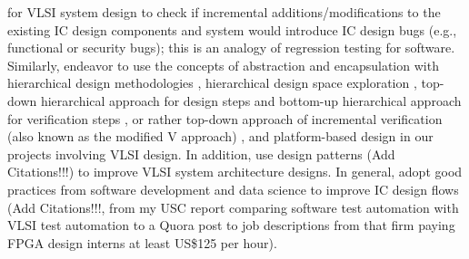 \documentclass[letter,12pt]{article}
\begin{document}
\cite{Poulos2018,Poulos2018a,Adler2017,Adler2017a,Poulos2014,Poulos2014a,Poulos2013,Bombieri2012,Bailey2010a,Li2008a,Agans2006,Thoziyoor2005,Burgess2004,Singh2004,Glusman2003} for VLSI system design to check if incremental additions/modifications to the existing IC design components and system would introduce IC design bugs (e.g., functional or security bugs); this is an analogy of regression testing for software. Similarly, endeavor to use the concepts of abstraction \cite{Lee2017a,Kropf1999,Hussein2008,Haynal2008a,Chauhan2007,Harris2007,Wang2006,Wang2004,Cong2003a,McIver2003,Stan2003,Furber2000,Kropf1999,Gil1998} and encapsulation \cite{Reddy2011,Marrer2009,Scott2009,Haynal2008a,Krogh2008a,Lee2008c,McIver2005,Baldwin2004,Raymond2004,Spolsky2004,Conway2003,Felleisen2001,Pratt2001,BrooksJr1995} with hierarchical design methodologies \cite{Buttazzo2011,Nuzzo2011,Fingeroff2010,Safarpour2009,Vaishnavi2008,Adya2004,Gupta2004,Krishnamachari1997,Krishnamachari1995}, hierarchical design space exploration \cite{Sun2011}, top-down hierarchical approach for design steps \cite{Kaeslin2015,Chen2012,Doboli2011,Gajski2009,Wieferink2008,Ho2007,Lu2007,SangiovanniVincentelli2007,Frevert2005} and bottom-up hierarchical approach for verification steps \cite{Chauhan2007,Wang2006,Frevert2005,McIver2003,Rashinkar2002}, or rather top-down approach of incremental verification (also known as the modified V approach) \cite{Bailey2010a}, and platform-based design \cite{Bailey2010a,Saponara2010,Gajski2009,Densmore2008,SangiovanniVincentelli2008,SangiovanniVincentelli2007,Burton2006,Saleh2006,Bailey2005,Madisetti2005,Martin2003,Chang2002,SangiovanniVincentelli2001,Keutzer2000} in our projects involving VLSI design. In addition, use design patterns ({\Huge Add Citations!!!}) to improve VLSI system architecture designs. In general, adopt good practices from software development and data science to improve IC design flows ({\Huge Add Citations!!!}, from my USC report comparing software test automation with VLSI test automation to a Quora post to job descriptions from that firm paying FPGA design interns at least US\$125 per hour). \\


\end{document}
